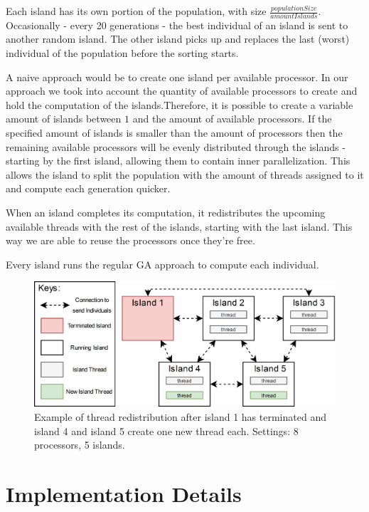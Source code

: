\documentclass[runningheads]{llncs}
\begin{document}
Each island has its own portion of the population, with size  $\frac{populationSize}{amountIslands}$. Occasionally - every 20 generations - the best individual of an island is sent to another random island. The other island picks up and replaces the last (worst) individual of the population before the sorting starts.

A naive approach would be to create one island per available processor. In our approach we took into account the quantity of available processors to create and hold the computation of the islands.Therefore, it is possible to create a variable amount of islands between $1$ and the amount of available processors. If the specified amount of islands is smaller than the amount of processors then the remaining available processors will be evenly distributed through the islands - starting by the first island, allowing them to contain inner parallelization. This allows the island to split the population with the amount of threads assigned to it and compute each generation quicker.

When an island completes its computation, it redistributes the upcoming available threads with the rest of the islands, starting with the last island. This way we are able to reuse the processors once they're free.

Every island runs the regular GA approach to compute each individual.

\begin{figure}[htbp]
\centering
\includegraphics[width=.92\textwidth]{IslandModel.png}
\caption{Example of thread redistribution after island 1 has terminated and island 4 and island 5 create one new thread each. Settings: 8 processors, 5 islands.} \label{islandDiagram}
\end{figure}

\section{Implementation Details}
\end{document}

